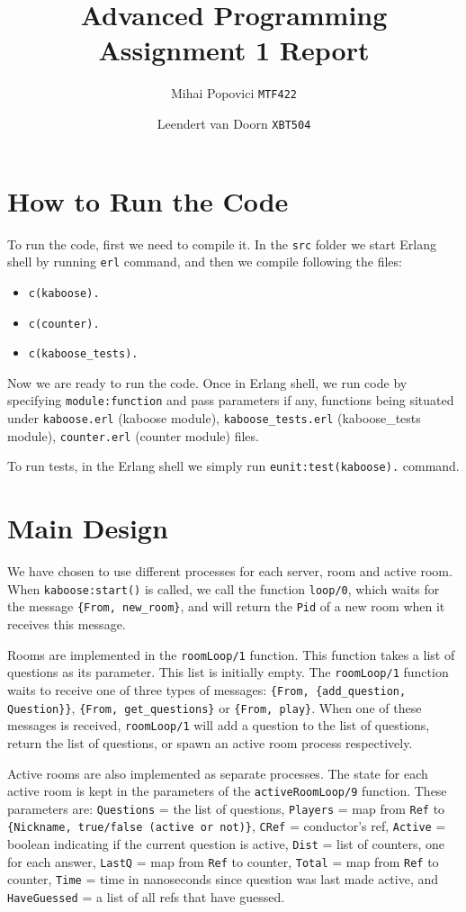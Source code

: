 \documentclass{article}
\title{Advanced Programming Assignment 1 Report}
\author{Mihai Popovici \texttt{MTF422} \and Leendert van Doorn \texttt{XBT504}}
\begin{document}
\maketitle	

\section{How to Run the Code}
To run the code, first we need to compile it. In the \texttt{src} folder we start Erlang shell by running \texttt{erl} command, and then we compile following the files:
\begin{itemize}
	\item \texttt{c(kaboose).}
	\item \texttt{c(counter).}
	\item \texttt{c(kaboose\_tests).}
\end{itemize} 
Now we are ready to run the code. Once in Erlang shell, we run code by specifying \texttt{module:function} and pass parameters if any, functions being situated under \texttt{kaboose.erl} (kaboose module), \texttt{kaboose\_tests.erl} (kaboose\_tests module), \texttt{counter.erl} (counter module) files.

To run tests, in the Erlang shell we simply run \texttt{eunit:test(kaboose).} command.

\section{Main Design}
We have chosen to use different processes for each server, room and active room. When \texttt{kaboose:start()} is called, we call the function \texttt{loop/0}, which waits for the message \texttt{\{From, new\_room\}}, and will return the \texttt{Pid} of a new room when it receives this message.

Rooms are implemented in the \texttt{roomLoop/1} function. This function takes a list of questions as its parameter. This list is initially empty. The \texttt{roomLoop/1} function waits to receive one of three types of messages: \texttt{\{From, \{add\_question, Question\}\}}, \texttt{\{From, get\_questions\}} or \texttt{\{From, play\}}. When one of these messages is received, \texttt{roomLoop/1} will add a question to the list of questions, return the list of questions, or spawn an active room process respectively.

Active rooms are also implemented as separate processes. The state for each active room is kept in the parameters of the \texttt{activeRoomLoop/9} function. These parameters are: \texttt{Questions} = the list of questions, \texttt{Players} = map from \texttt{Ref} to \texttt{\{Nickname, true/false (active or not)\}}, \texttt{CRef} = conductor's ref, \texttt{Active} = boolean indicating if the current question is active, \texttt{Dist} = list of counters, one for each answer, \texttt{LastQ} = map from \texttt{Ref} to counter, \texttt{Total} = map from \texttt{Ref} to counter, \texttt{Time} = time in nanoseconds since question was last made active, and \texttt{HaveGuessed} = a list of all refs that have guessed.
\end{document}
